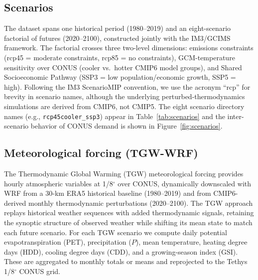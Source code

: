 \documentclass[fleqn,10pt]{wlscirep}
\providecommand{\DIFadd}[1]{{\protect\color{blue}\uwave{#1}}} %
\providecommand{\DIFaddbegin}{} %
\providecommand{\DIFaddend}{} %
\begin{document}
\subsection*{Scenarios}

The dataset spans one historical period (1980--2019) and an eight-scenario factorial of futures (2020--2100), constructed jointly with the IM3/GCIMS framework\cite{Mongird2025CERF}. The factorial crosses three two-level dimensions: emissions constraints (rcp45 = moderate constraints, rcp85 = no constraints), GCM-temperature sensitivity over CONUS (cooler vs.\ hotter CMIP6 model groups), and Shared Socioeconomic Pathway (SSP3 = low population/economic growth, SSP5 = high). Following the IM3 ScenarioMIP convention, we use the acronym ``rcp'' for brevity in scenario names, although the underlying perturbed-thermodynamics simulations are derived from CMIP6, not CMIP5\cite{Mongird2025CERF}. The eight scenario directory names (e.g., \texttt{rcp45cooler\_ssp3}) appear in Table~\ref{tab:scenarios} and the inter-scenario behavio\DIFaddbegin \DIFadd{u}\DIFaddend r of CONUS demand is shown in Figure~\ref{fig:scenarios}.

\subsection*{Meteorological forcing (TGW-WRF)}

The Thermodynamic Global Warming (TGW) meteorological forcing\cite{Jones2023TGW} provides hourly atmospheric variables at 1/8$^{\circ}$ over CONUS, dynamically downscaled with WRF from a 30-km ERA5 historical baseline (1980--2019) and from CMIP6-derived monthly thermodynamic perturbations (2020--2100). The TGW approach replays historical weather sequences with added thermodynamic signals, retaining the synoptic structure of observed weather while shifting its mean state to match each future scenario. For each TGW scenario we compute daily potential evapotranspiration (PET), precipitation ($P$), mean temperature, heating degree days (HDD), cooling degree days (CDD), and a growing-season index (GSI). These are aggregated to monthly totals or means and reprojected to the Tethys 1/8$^{\circ}$ CONUS grid.
\end{document}
